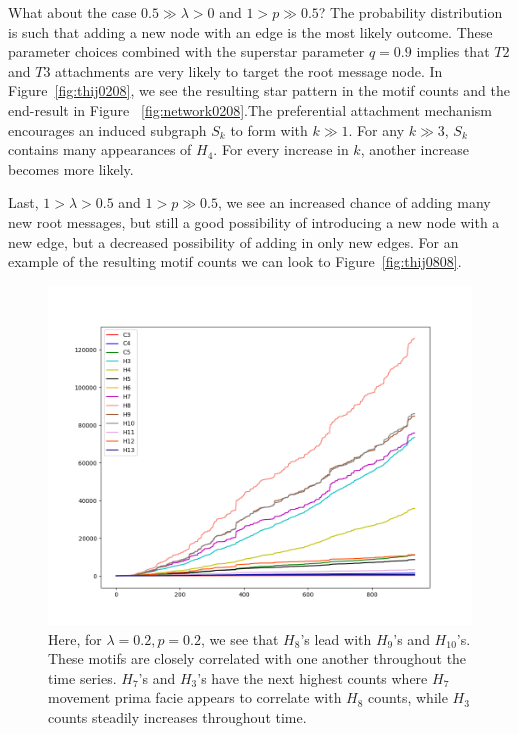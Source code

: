What about the case $0.5 \gg \lambda > 0$ and $1 > p \gg 0.5$? The probability distribution is such that adding a new node
with an edge is the most likely outcome. These parameter choices combined with the superstar parameter $q=0.9$ implies that $T2$ and $T3$
attachments are very likely to target the root message node. In Figure~\ref{fig:thij0208}, we see the resulting star pattern in the motif counts 
and the end-result in Figure ~\ref{fig:network0208}.The preferential attachment mechanism encourages
an induced subgraph $S_{k}$ to form with $k\gg 1$. For any $k \gg 3$, $S_{k}$
contains many appearances of $H_{4}$. For every increase in $k$, another increase becomes more likely.

Last, $1>\lambda>0.5$ and $1>p\gg0.5$, we see an increased chance of adding
many new root messages, but still a good possibility of introducing a new node with a new edge, but a decreased possibility of 
adding in only new edges. For an example of the resulting motif counts we can look to Figure~\ref{fig:thij0808}. 


\begin{figure}[h!]
    \includegraphics[width=15cm]{Images/twitter_sim_for_stats_3_0.2_0.2.png}
    \centering
    \caption{Here, for $\lambda=0.2, p=0.2$, we see that $H_{8}$'s lead with $H_{9}$'s and $H_{10}$'s. These motifs are
     closely correlated with one another throughout the time series. $H_{7}$'s
    and $H_{3}$'s have the next highest counts where $H_{7}$ movement prima facie
    appears to correlate with $H_{8}$ counts, while $H_{3}$ counts steadily increases throughout time.}
    \label{fig:thij0202}
\end{figure}

